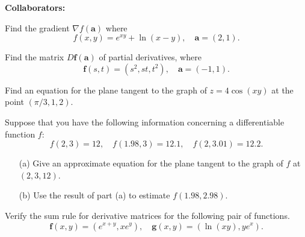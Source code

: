 \documentclass[11pt,letterpaper,boxed]{hmcpset}
\begin{document}
\noindent\textbf{Collaborators:} 


\begin{problem}[Colley 2.3 \#22]
Find the gradient $\nabla f(\mathbf{a})$ where
\[
	f(x,y) = e^{xy}+\ln(x-y), \quad \mathbf{a}=(2,1).
\]
\end{problem}

\begin{solution}
\vfill
\end{solution}
\newpage

\begin{problem}[Colley 2.3 \#33]
Find the matrix $D\mathbf{f}(\mathbf{a})$ of partial derivatives, where
\[
	\mathbf{f}(s,t) = (s^2,st,t^2),\quad \mathbf{a} = (-1,1).
\]
\end{problem}

\begin{solution}
\vfill
\end{solution}
\newpage

\begin{problem}[Colley 2.3 \#38]
Find an equation for the plane tangent to the graph of $z=4\cos{(xy)}$ at
the point $(\pi/3,1,2)$.
\end{problem}

\begin{solution}
\vfill
\end{solution}
\newpage

\begin{problem}[Colley 2.3 \#42]
Suppose that you have the following information concerning a differentiable function $f$:
\[
	f(2,3) = 12, \quad f(1.98,3) = 12.1, \quad f(2,3.01) = 12.2.
\]
\begin{enumerate}
\item[(a)] Give an approximate equation for the plane tangent to the graph of $f$ at $(2,3,12)$.
\item[(b)] Use the result of part (a) to estimate $f(1.98, 2.98)$.
\end{enumerate}
\end{problem}

\begin{solution}
\vfill
\end{solution}
\newpage

\begin{problem}[Colley 2.4 \#2]
Verify the sum rule for derivative matrices for the following pair of functions.
\[
	\mathbf{f}(x,y) = (e^{x+y},xe^y), \quad \mathbf{g}(x,y)=(\ln{(xy)},ye^x).
\]
\end{problem}
\end{document}
